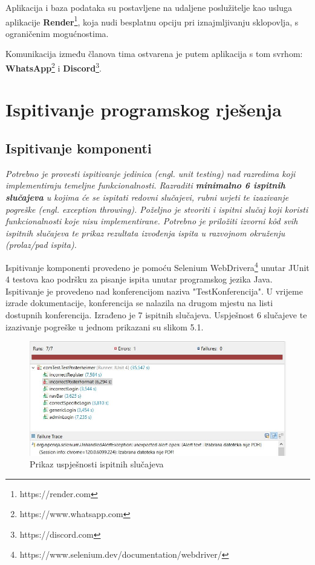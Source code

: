 			Aplikacija i baza podataka su postavljene na udaljene poslužitelje kao usluga aplikacije \textbf{Render}\footnote{https://render.com}, koja nudi besplatnu opciju pri iznajmljivanju sklopovlja, s ograničenim mogućnostima.
			
			Komunikacija između članova tima ostvarena je putem aplikacija s tom svrhom: \textbf{WhatsApp}\footnote{https://www.whatsapp.com} i \textbf{Discord}\footnote{https://discord.com}.
			
			\eject 
		
	
		\section{Ispitivanje programskog rješenja}	 
			
			\subsection{Ispitivanje komponenti}
			\textit{Potrebno je provesti ispitivanje jedinica (engl. unit testing) nad razredima koji implementiraju temeljne funkcionalnosti. Razraditi \textbf{minimalno 6 ispitnih slučajeva} u kojima će se ispitati redovni slučajevi, rubni uvjeti te izazivanje pogreške (engl. exception throwing). Poželjno je stvoriti i ispitni slučaj koji koristi funkcionalnosti koje nisu implementirane. Potrebno je priložiti izvorni kôd svih ispitnih slučajeva te prikaz rezultata izvođenja ispita u razvojnom okruženju (prolaz/pad ispita). }
			
			Ispitivanje komponenti provedeno je pomoću Selenium WebDrivera\footnote{https://www.selenium.dev/documentation/webdriver/} unutar JUnit 4 testova kao podršku za pisanje ispita unutar programskog jezika Java. Ispitivanje je provedeno nad konferencijom naziva "TestKonferencija". U vrijeme izrade dokumentacije, konferencija se nalazila na drugom mjestu na listi dostupnih konferencija. 
			Izrađeno je 7 ispitnih slučajeva. Uspješnost 6 slučajeve te izazivanje pogreške u jednom prikazani su slikom 5.1.
			
			\begin{figure} [hbt!]
				\includegraphics[width=\linewidth]{Slike/testResults}
				\caption{Prikaz uspješnosti ispitnih slučajeva}
			\end{figure}
			
